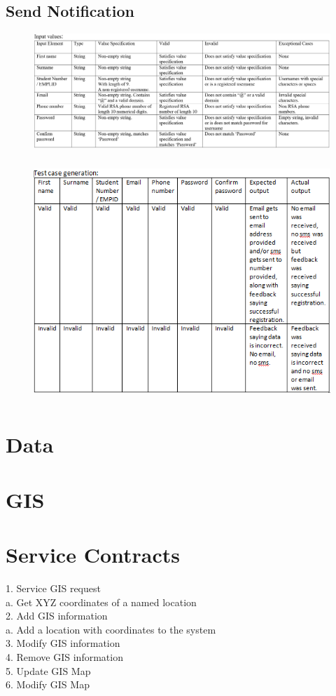 \documentclass[english]{article}
\begin{document}
\subsection{Send Notification}
\begin{figure}[H]
    \label{tab:example}
\hspace*{-2.5cm} 
\includegraphics[width=180mm]{5.png}
\end{figure}

\begin{figure}[H]
\hspace*{-2.5cm} 
\includegraphics[width=180mm,height=90mm]{NotificationsTest.png}
\end{figure}

\section{Data}
\section{GIS}
\section{Service Contracts}
1.	Service GIS request\\
	a.	Get XYZ coordinates of a named location\\
2.	Add GIS information\\
	a.	Add a location with coordinates to the system\\
3.	Modify GIS information\\
4.	Remove GIS information\\
5.	Update GIS Map\\
6.	Modify GIS Map\\
\end{document}
